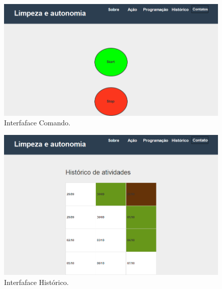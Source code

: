 \begin{figure}[H]                                    
  \centering                                         
  \includegraphics[scale=0.4]{figuras/comando.png}
  \caption{Interfaface Comando.}                        
  \label{img:inter_comando}                              
\end{figure}

\begin{figure}[H]                                    
  \centering                                         
  \includegraphics[scale=0.4]{figuras/historico.png}
  \caption{Interfaface Histórico.}                        
  \label{img:inter_historico}                              
\end{figure}

